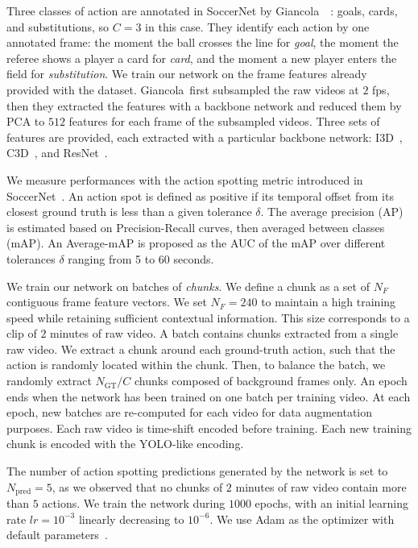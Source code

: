 \documentclass[10pt,twocolumn,letterpaper]{article}
\begin{document}
 Three classes of action are annotated in SoccerNet by Giancola~\etal~\cite{Giancola_2018_CVPR_Workshops}: goals, cards, and substitutions, so $C=3$ in this case. They identify each action by one annotated frame: the moment the ball crosses the line for \emph{goal}, the moment the referee shows a player a card for \emph{card}, and the moment a new player enters the field for \emph{substitution}. We train our network on the frame features already provided with the dataset. Giancola~\etal first subsampled the raw videos at $2$ fps, then they extracted the features with a backbone network and reduced them by PCA to $512$ features for each frame of the subsampled videos. Three sets of features are provided, each extracted with a particular backbone network: I3D~\cite{Carreira_2017_CVPR}, C3D~\cite{Tran2015ICCV}, and ResNet~\cite{He_2016_CVPR}.


We measure performances with the action spotting metric introduced in SoccerNet~\cite{Giancola_2018_CVPR_Workshops}. An action spot is defined as positive if its temporal offset from its closest ground truth is less than a given tolerance $\delta$. The average precision (AP) is estimated based on Precision-Recall curves, then averaged between classes (mAP). An Average-mAP is proposed as the AUC of the mAP over different tolerances $\delta$ ranging from 5 to 60 seconds.


 We train our network on batches of \emph{chunks}. We define a chunk as a set of $N_F$ contiguous frame feature vectors. We set $N_F=240$ to maintain a high training speed while retaining sufficient contextual information. This size corresponds to a clip of $2$ minutes of raw video. A batch contains chunks extracted from a single raw video. We extract a chunk around each ground-truth action, such that the action is randomly located within the chunk. Then, to balance the batch, we randomly extract $N_\text{GT}/C$ chunks composed of background frames only. An epoch ends when the network has been trained on one batch per training video. At each epoch, new batches are re-computed for each video for data augmentation purposes. Each raw video is time-shift encoded before training. Each new training chunk is encoded with the YOLO-like encoding. 


The number of action spotting predictions generated by the network is set to $N_\text{pred}=5$, as we observed that no chunks of $2$ minutes of raw video contain more than $5$ actions. We train the network during $1000$ epochs, with an initial learning rate $lr=10^{-3}$ linearly decreasing to $10^{-6}$. We use Adam as the optimizer with default parameters~\cite{Diederick2015Adam}.
\end{document}
